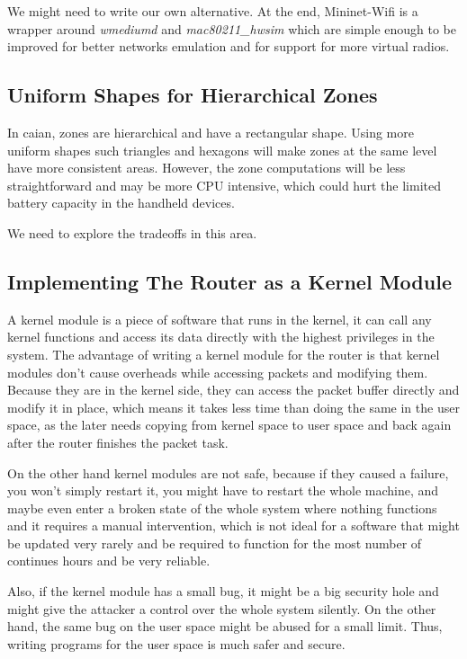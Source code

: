 We might need to write our own alternative.
At the end, Mininet-Wifi is a wrapper around \textit{wmediumd} and \textit{mac80211\_hwsim} which are simple enough to be improved for better networks emulation and for support for more virtual radios.

\subsection{Uniform Shapes for Hierarchical Zones}
In \acrshort{caian}, zones are hierarchical and have a rectangular shape. Using more uniform shapes such triangles and hexagons will make zones at the same level have more consistent areas. However, the zone computations will be less straightforward and may be more CPU intensive, which could hurt the limited battery capacity in the handheld devices.

We need to explore the tradeoffs in this area.

\subsection{Implementing The Router as a Kernel Module}
A kernel module is a piece of software that runs in the kernel, it can call any kernel functions and access its data directly with the highest privileges in the system.
The advantage of writing a kernel module for the router is that kernel modules don't cause overheads while accessing packets and modifying them.
Because they are in the kernel side, they can access the packet buffer directly and modify it in place, which means it takes less time than doing the same in the user space, as the later needs copying from kernel space to user space and back again after the router finishes the packet task.

On the other hand kernel modules are not safe, because if they caused a failure, you won't simply restart it, you might have to restart the whole machine, and maybe even enter a broken state of the whole system where nothing functions and it requires a manual intervention, which is not ideal for a software that might be updated very rarely and be required to function for the most number of continues hours and be very reliable.

Also, if the kernel module has a small bug, it might be a big security hole and might give the attacker a control over the whole system silently.
On the other hand, the same bug on the user space might be abused for a small limit.
Thus, writing programs for the user space is much safer and secure.

